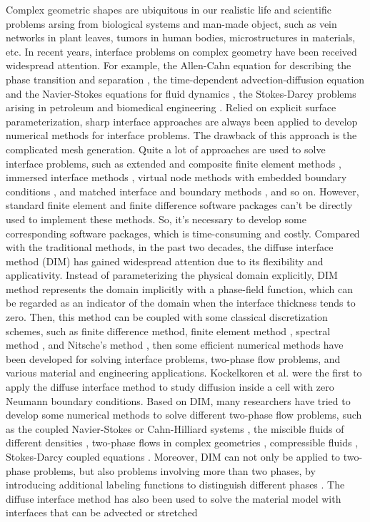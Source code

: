 \documentclass[3p,times]{elsarticle}
\numberwithin{equation}{section}
\begin{document}
Complex geometric shapes are ubiquitous in our realistic life and scientific problems arsing from biological systems and man-made object, such as vein networks in plant leaves, tumors in human bodies, microstructures in materials, etc. In recent years, interface problems on complex geometry have been received widespread attention. For example, the Allen-Cahn equation \cite{Acta1979} for describing the phase transition and separation \cite{DuFeng2020}, the time-dependent advection-diffusion equation and the Navier-Stokes equations for fluid dynamics \cite{Roger1984}, the Stokes-Darcy problems arising in petroleum and biomedical engineering \cite{MartinaBoris2023}. Relied on explicit surface parameterization, sharp interface approaches are always been applied to develop numerical methods for interface problems. The drawback of this approach is the complicated mesh generation. Quite a lot of approaches are used to solve interface problems, such as extended and composite finite element methods \cite{DolbowHarari2009,FriesBelytschko2010}, immersed interface methods \cite{LeVequeLi1995,LiIto2006,WangKai2023}, virtual node methods with embedded boundary conditions \cite{BedrossianZhu2010,HellrungLee2012}, and matched interface and boundary methods \cite{ZhaoWei2009,LiFeng2015,AmlanRay2023}, and so on. However, standard finite element and finite difference software packages can't be directly used to implement these methods. So, it's necessary to develop some corresponding software packages, which is time-consuming and costly. Compared with the traditional methods, in the past two decades, the diffuse interface method (DIM) has gained widespread attention due to its flexibility and applicativity. Instead of parameterizing the physical domain explicitly, DIM method represents the domain implicitly with a phase-field function, which can be regarded as an indicator of the domain when the interface thickness tends to zero. Then, this method can be coupled with some classical discretization schemes, such as finite difference method,  finite element method \cite{YangMao2019}, spectral method \cite{BuenoFenton2006}, and Nitsche's method \cite{NguyenStoter2018}, then some efficient numerical methods have been developed for solving interface problems, two-phase flow problems, and various material and engineering applications. Kockelkoren et al. \cite{KockelkorenLevine2003} were the first to apply the diffuse interface method to study diffusion inside a cell with zero Neumann boundary conditions. Based on DIM, many researchers have tried to develop some numerical methods to solve different two-phase flow problems, such as the coupled Navier-Stokes or Cahn-Hilliard systems \cite{FrigeriGrasselli2015,Abels2009}, the miscible fluids of different densities \cite{AbelsLengeler2014}, two-phase flows in complex geometries \cite{LiuChai2022}, compressible fluids \cite{FeireislRocca2010}, Stokes-Darcy coupled equations \cite{MartinaBoris2023}. Moreover, DIM can not only be applied to two-phase problems, but also problems involving more than two phases, by introducing additional labeling functions to distinguish different phases \cite{BrannickLiu2015}. The diffuse interface method has also been used to solve the material model with interfaces that can be advected or stretched 
\end{document}
